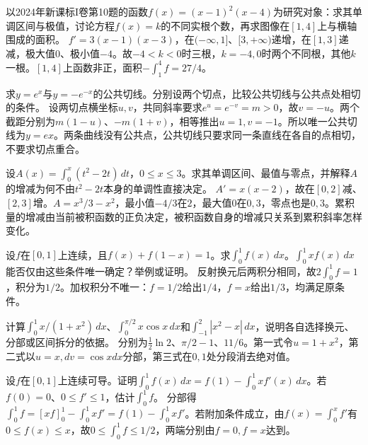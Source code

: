 以2024年新课标I卷第10题的函数\(f(x)=(x-1)^2(x-4)\)为研究对象：求其单调区间与极值，讨论方程\(f(x)=k\)的不同实根个数，再求图像在\([1,4]\)上与横轴围成的面积。
\solutionanswer
\(f'=3(x-1)(x-3)\)，在\(( -\infty,1]\)、\([3,+\infty)\)递增，在\([1,3]\)递减，极大值\(0\)、极小值\(-4\)。故\(-4<k<0\)时三根，\(k=-4,0\)时两个不同根，其他\(k\)一根。\([1,4]\)上函数非正，面积\(-\int_1^4f=27/4\)。


求\(y=e^x\)与\(y=-e^{-x}\)的公共切线。分别设两个切点，比较公共切线与公共点处相切的条件。
\solutionanswer
设两切点横坐标\(u,v\)，共同斜率要求\(e^u=e^{-v}=m>0\)，故\(v=-u\)。两个截距分别为\(m(1-u)\)、\(-m(1+v)\)，相等推出\(u=1,v=-1\)。所以唯一公共切线为\(y=ex\)。两条曲线没有公共点，公共切线只要求同一条直线在各自的点相切，不要求切点重合。


设\(A(x)=\int_0^x(t^2-2t)\,dt\)，\(0\le x\le3\)。求其单调区间、最值与零点，并解释\(A\)的增减为何不由\(t^2-2t\)本身的单调性直接决定。
\solutionanswer
\(A'=x(x-2)\)，故在\([0,2]\)减、\([2,3]\)增。\(A=x^3/3-x^2\)，最小值\(-4/3\)在\(2\)，最大值\(0\)在\(0,3\)，零点也是\(0,3\)。累积量的增减由当前被积函数的正负决定，被积函数自身的增减只关系到累积斜率怎样变化。


设\(f\)在\([0,1]\)上连续，且\(f(x)+f(1-x)=1\)。求\(\int_0^1f(x)\,dx\)。\(\int_0^1xf(x)\,dx\)能否仅由这些条件唯一确定？举例或证明。
\solutionanswer
反射换元后两积分相同，故\(2\int_0^1f=1\)，积分为\(1/2\)。加权积分不唯一：\(f=1/2\)给出\(1/4\)，\(f=x\)给出\(1/3\)，均满足原条件。


计算\(\int_0^1 x/(1+x^2)\,dx\)、\(\int_0^{\pi/2}x\cos x\,dx\)和\(\int_{-1}^2|x^2-x|\,dx\)，说明各自选择换元、分部或区间拆分的依据。
\solutionanswer
分别为\(\frac12\ln2\)、\(\pi/2-1\)、\(11/6\)。第一式令\(u=1+x^2\)，第二式以\(u=x,dv=\cos xdx\)分部，第三式在\(0,1\)处分段消去绝对值。


设\(f\)在\([0,1]\)上连续可导。证明\(\int_0^1f(x)\,dx=f(1)-\int_0^1xf'(x)\,dx\)。若\(f(0)=0\)、\(0\le f'\le1\)，估计\(\int_0^1 f\)。
\solutionanswer
分部得\(\int_0^1f=[xf]_0^1-\int_0^1xf'=f(1)-\int_0^1xf'\)。若附加条件成立，由\(f(x)=\int_0^xf'\)有\(0\le f(x)\le x\)，故\(0\le\int_0^1f\le1/2\)，两端分别由\(f=0,f=x\)达到。


